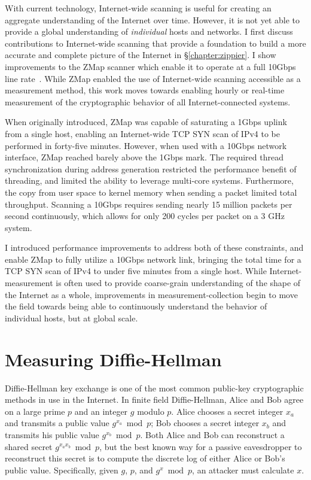 With current technology, Internet-wide scanning is useful for creating an
aggregate understanding of the Internet over time. However, it is not yet
able to provide a global understanding of \textit{individual} hosts and
networks. I first discuss contributions to Internet-wide scanning that
provide a foundation to build a more accurate and complete picture of the
Internet in \S\ref{chapter:zippier}. I show improvements to the ZMap scanner
which enable it to operate at a full 10Gbps line
rate~\cite{zippier-zmap-2014}. While ZMap enabled the use of Internet-wide
scanning accessible as a measurement method, this work moves towards enabling
hourly or real-time measurement of the cryptographic behavior of all
Internet-connected systems.

When originally introduced, ZMap was capable of saturating a 1Gbps uplink from
a single host, enabling an Internet-wide TCP SYN scan of IPv4 to be performed
in forty-five minutes. However, when used with a 10Gbps network interface, ZMap
reached barely above the 1Gbps mark. The required thread synchronization during
address generation restricted the performance benefit of threading, and limited
the ability to leverage multi-core systems. Furthermore, the copy from user
space to kernel memory when sending a packet limited total throughput. Scanning
a 10Gbps requires sending nearly 15 million packets per second continuously,
which allows for only 200 cycles per packet on a 3 GHz system.

I introduced performance improvements to address both of these constraints, and
enable ZMap to fully utilize a 10Gbps network link, bringing the total time for
a TCP SYN scan of IPv4 to under five minutes from a single host. While
Internet-measurement is often used to provide coarse-grain understanding of the
shape of the Internet as a whole, improvements in measurement-collection begin
to move the field towards being able to continuously understand the behavior of
individual hosts, but at global scale.

\section{Measuring Diffie-Hellman}

Diffie-Hellman key exchange is one of the most common public-key
cryptographic methods in use in the Internet. In finite field Diffie-Hellman,
Alice and Bob agree on a large prime $p$ and an integer $g$ modulo $p$. Alice
chooses a secret integer $x_a$ and transmits a public value $g^{x_a} \bmod
p$; Bob chooses a secret integer $x_b$ and transmits his public value
$g^{x_b} \bmod p$. Both Alice and Bob can reconstruct a shared secret $g^{x_a
x_b} \bmod p$, but the best known way for a passive eavesdropper to
reconstruct this secret is to compute the discrete log of either Alice or
Bob's public value. Specifically, given $g$, $p$, and $g^x \bmod p$, an
attacker must calculate $x$.

